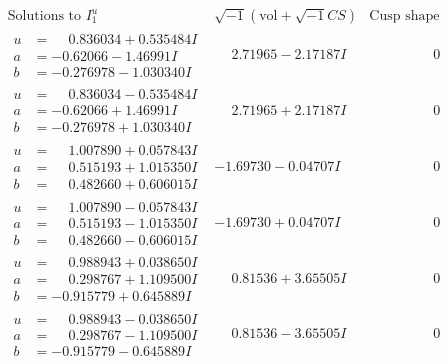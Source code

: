\documentclass[1p]{elsarticle_modified}
\theoremstyle{definition}
\newcommand{\I}{\sqrt{-1}}
\begin{document}
$$\begin{array}{c|c|c}  
\text{Solutions to }I^u_{1}& \I (\text{vol} + \sqrt{-1}CS) & \text{Cusp shape}\\
 \hline 
\begin{aligned}
u &= \phantom{-}0.836034 + 0.535484 I \\
a &= -0.62066 - 1.46991 I \\
b &= -0.276978 - 1.030340 I\end{aligned}
 & \phantom{-}2.71965 - 2.17187 I & \phantom{-0.000000 } 0 \\ \hline\begin{aligned}
u &= \phantom{-}0.836034 - 0.535484 I \\
a &= -0.62066 + 1.46991 I \\
b &= -0.276978 + 1.030340 I\end{aligned}
 & \phantom{-}2.71965 + 2.17187 I & \phantom{-0.000000 } 0 \\ \hline\begin{aligned}
u &= \phantom{-}1.007890 + 0.057843 I \\
a &= \phantom{-}0.515193 + 1.015350 I \\
b &= \phantom{-}0.482660 + 0.606015 I\end{aligned}
 & -1.69730 - 0.04707 I & \phantom{-0.000000 } 0 \\ \hline\begin{aligned}
u &= \phantom{-}1.007890 - 0.057843 I \\
a &= \phantom{-}0.515193 - 1.015350 I \\
b &= \phantom{-}0.482660 - 0.606015 I\end{aligned}
 & -1.69730 + 0.04707 I & \phantom{-0.000000 } 0 \\ \hline\begin{aligned}
u &= \phantom{-}0.988943 + 0.038650 I \\
a &= \phantom{-}0.298767 + 1.109500 I \\
b &= -0.915779 + 0.645889 I\end{aligned}
 & \phantom{-}0.81536 + 3.65505 I & \phantom{-0.000000 } 0 \\ \hline\begin{aligned}
u &= \phantom{-}0.988943 - 0.038650 I \\
a &= \phantom{-}0.298767 - 1.109500 I \\
b &= -0.915779 - 0.645889 I\end{aligned}
 & \phantom{-}0.81536 - 3.65505 I & \phantom{-0.000000 } 0 \\ \hline\begin{aligned}

\end{aligned}
\end{array}$$
\end{document}

